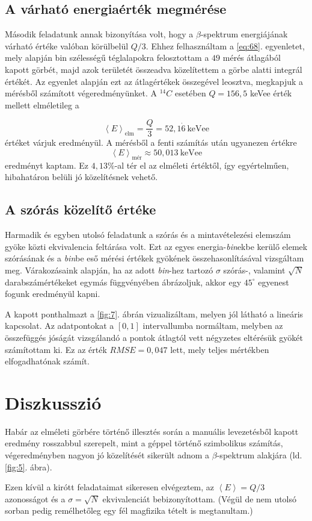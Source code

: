 \begin{multicols}{2}
\subsection{A várható energiaérték megmérése}
Második feladatunk annak bizonyítása volt, hogy a $\beta$-spektrum energiájának várható értéke valóban körülbelül $Q/3$. Ehhez felhasználtam a \ref{eq:68}. egyenletet, mely alapján bin szélességű téglalapokra felosztottam a $49$ mérés átlagából kapott görbét, majd azok területét összeadva közelítettem a görbe alatti integrál értékét. Az egyenlet alapján ezt az átlagértékek összegével leosztva, megkapjuk a mérésből számított végeredményünket. A $^{14}C$ esetében $Q=156,5$ keVee érték mellett elméletileg a

\begin{equation}
\left< E \right>_{\text{elm}}
=
\frac{Q}{3}
=
52,1\dot{6}\ \text{keVee}
\end{equation}
értéket várjuk eredményül. A mérésből a fenti számítás után ugyanezen értékre
\begin{equation}
\left< E \right>_{\text{mér}}
\approx
50,013\ \text{keVee}
\end{equation}
eredményt kaptam. Ez $4,13\%$-al tér el az elméleti értéktől, így egyértelműen, hibahatáron belüli jó közelítésnek vehető.

\subsection{A szórás közelítő értéke}
Harmadik és egyben utolsó feladatunk a szórás és a mintavételezési elemszám gyöke közti ekvivalencia feltárása volt. Ezt az egyes energia-\emph{bin}ekbe kerülő elemek szórásának és a \emph{bin}be eső mérési értékek gyökének összehasonlításával vizsgáltam meg. Várakozásaink alapján, ha az adott \emph{bin}-hez tartozó $\sigma$ szórás-, valamint $\sqrt{N}$ darabszámértékeket egymás függvényében ábrázoljuk, akkor egy $45^{\circ}$ egyenest fogunk eredményül kapni. \par
A kapott ponthalmazt a \ref{fig:7}. ábrán vizualizáltam, melyen jól látható a lineáris kapcsolat. Az adatpontokat a $\left[ 0, 1 \right]$ intervallumba normáltam, melyben az összefüggés jóságát vizsgálandó a pontok átlagtól vett négyzetes eltérésük gyökét számítottam ki. Ez az érték $RMSE = 0,047$ lett, mely teljes mértékben elfogadhatónak számít.

\section{Diszkusszió}
Habár az elméleti görbére történő illesztés során a manuális levezetésből kapott eredmény rosszabbul szerepelt, mint a géppel történő szimbolikus számítás, végeredményben nagyon jó közelítését sikerült adnom a $\beta$-spektrum alakjára (ld. \ref{fig:5}. ábra). \par
Ezen kívül a kirótt feladataimat sikeresen elvégeztem, az $\left< E \right> = Q/3$ azonosságot és a $\sigma = \sqrt{N}$ ekvivalenciát bebizonyítottam. (Végül de nem utolsó sorban pedig remélhetőleg egy fél magfizika tételt is megtanultam.)

\end{multicols}